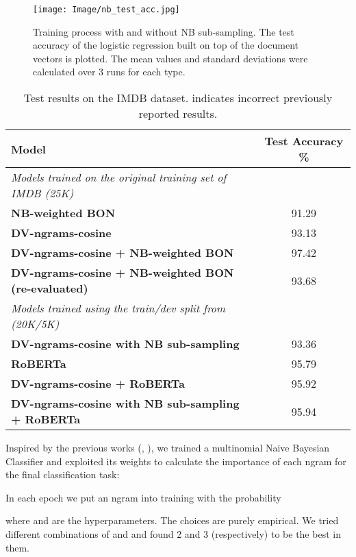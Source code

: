 \documentclass[11pt]{article}
\begin{document}
\begin{figure}[!htb] \centering \texttt{[image: Image/nb\_test\_acc.jpg]}
    \caption{Training process with and without NB sub-sampling. The test accuracy of the logistic regression built on top of the document vectors is plotted. The mean values and standard deviations were calculated over 3 runs for each type.}
    \label{fig:sub_samp}
\end{figure}

\begin{table*}
\centering
\begin{tabular}{lc}
\hline
\textbf{Model} & \textbf{Test Accuracy \%}\\
\hline
\textit{Models trained on the original training set of IMDB (25K)} &  \\
\textbf{NB-weighted BON} & 91.29 \\
\textbf{DV-ngrams-cosine} & 93.13 \\
\textbf{DV-ngrams-cosine + NB-weighted BON \cite{thongtan-phienthrakul-2019-sentiment}} & 97.42 \\
\textbf{DV-ngrams-cosine + NB-weighted BON (re-evaluated)} & 93.68 \\
\hline
\textit{Models trained using the train/dev split from~\cite{suchin2020} (20K/5K)} & \\
\textbf{DV-ngrams-cosine with NB sub-sampling} & 93.36 \\
\textbf{RoBERTa} & 95.79 \\
\textbf{DV-ngrams-cosine + RoBERTa} & 95.92 \\
\textbf{DV-ngrams-cosine with NB sub-sampling + RoBERTa} & 95.94 \\
\hline
\end{tabular}
\caption{Test results on the IMDB dataset.  indicates incorrect previously reported results.}
\label{tab:imdb_acc}
\end{table*}

Inspired by the previous works (\citet{wang-manning-2012-baselines}, \citet{arefyev2021nb-mlm}), we trained a multinomial Naive Bayesian Classifier and exploited its weights to calculate the importance of each ngram  for the final classification task:

In each epoch we put an ngram into training with the probability

where  and  are the hyperparameters. The choices are purely empirical. We tried different combinations of  and  and found 2 and 3 (respectively) to be the best in them.
\end{document}
